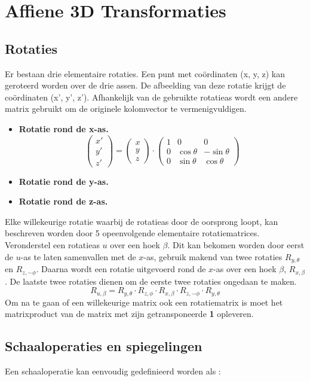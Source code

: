 \documentclass{report}
\begin{document}
	\section{Affiene 3D Transformaties}
	\subsection{Rotaties}
	Er bestaan drie elementaire rotaties. Een punt met coördinaten (x, y, z) kan geroteerd worden over de drie assen. De afbeelding van deze rotatie krijgt de coördinaten (x', y', z'). Afhankelijk van de gebruikte rotatieas wordt een andere matrix gebruikt om de originele kolomvector te vermenigvuldigen.
	\begin{itemize}
		\item \textbf{Rotatie rond de x-as.}
			\[
				\begin{pmatrix}
					x' \\
					y' \\
					z'
				\end{pmatrix}
				=
				\begin{pmatrix}
					x \\
					y \\
					z
				\end{pmatrix}
				\cdot
				\begin{pmatrix}
					1 & 0 & 0 \\
					0 & \cos \theta & - \sin \theta \\
					0 & \sin \theta &   \cos \theta  
				\end{pmatrix}
			\]
		\item \textbf{Rotatie rond de y-as.}
		\item \textbf{Rotatie rond de z-as.}
	\end{itemize}
	Elke willekeurige rotatie waarbij de rotatieas door de oorsprong loopt, kan beschreven worden door 5 opeenvolgende elementaire rotatiematrices. Veronderstel een rotatieas $u$ over een hoek $\beta$. Dit kan bekomen worden door eerst de $u$-as te laten samenvallen met de $x$-as, gebruik makend van twee rotaties $R_{y,\theta}$ en $R_{z, -\phi}$. Daarna wordt een rotatie uitgevoerd rond de $x$-as over een hoek $\beta$, $R_{x,\beta}$. De laatste twee rotaties dienen om de eerste twee rotaties ongedaan te maken.
	$$R_{u, \beta} = R_{y, \theta} \cdot R_{z, \phi} \cdot R_{x, \beta} \cdot R_{z, -\phi} \cdot R_{y,\theta}$$
	Om na te gaan of een willekeurige matrix ook een rotatiematrix is moet het matrixproduct van de matrix met zijn getransponeerde \textbf{1} opleveren.
	\subsection{Schaaloperaties en spiegelingen}
	Een schaaloperatie kan eenvoudig gedefinieerd worden als :
\end{document}

